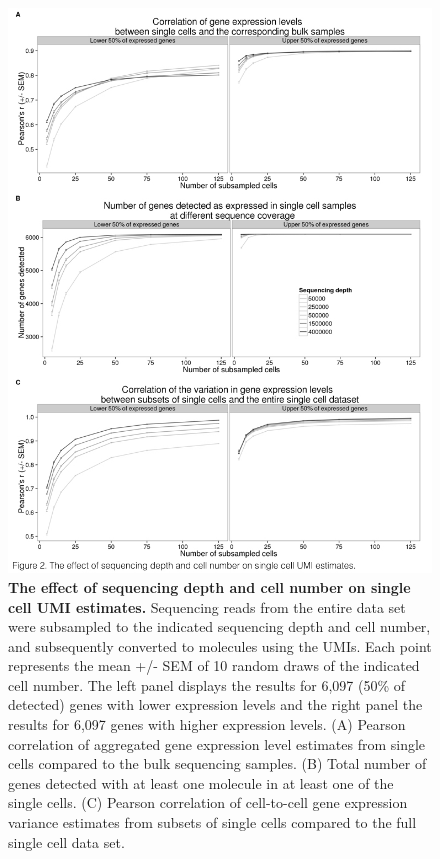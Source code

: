 \begin{figure}
\centering \includegraphics[trim=0 .3in 0
  0,clip,width=5in]{img/ch04/Figure02.jpeg}
\caption[The effect of sequencing depth and cell number on single cell
  UMI estimates.]{\textbf{The effect of sequencing depth and cell
    number on single cell UMI estimates.} Sequencing reads from the
  entire data set were subsampled to the indicated sequencing depth
  and cell number, and subsequently converted to molecules using the
  UMIs. Each point represents the mean +/- SEM of 10 random draws of
  the indicated cell number. The left panel displays the results for
  6,097 (50\% of detected) genes with lower expression levels and the
  right panel the results for 6,097 genes with higher expression
  levels. (A) Pearson correlation of aggregated gene expression level
  estimates from single cells compared to the bulk sequencing
  samples. (B) Total number of genes detected with at least one
  molecule in at least one of the single cells.  (C) Pearson
  correlation of cell-to-cell gene expression variance estimates from
  subsets of single cells compared to the full single cell data set.}
\label{fig:subsample}
\end{figure}

